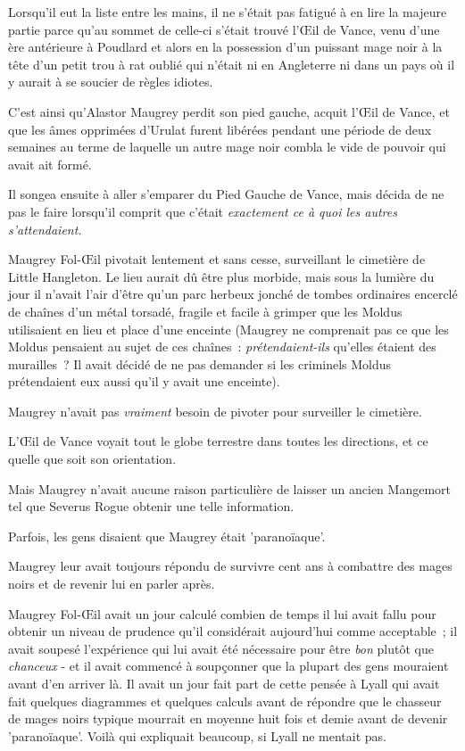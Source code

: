Lorsqu'il eut la liste entre les mains, il ne s'était pas fatigué à en lire la majeure partie parce qu'au sommet de celle-ci s'était trouvé l'Œil de Vance, venu d'une ère antérieure à Poudlard et alors en la possession d'un puissant mage noir à la tête d'un petit trou à rat oublié qui n'était ni en Angleterre ni dans un pays où il y aurait à se soucier de règles idiotes.

C'est ainsi qu'Alastor Maugrey perdit son pied gauche, acquit l'Œil de Vance, et que les âmes opprimées d'Urulat furent libérées pendant une période de deux semaines au terme de laquelle un autre mage noir combla le vide de pouvoir qui avait ait formé.

Il songea ensuite à aller s'emparer du Pied Gauche de Vance, mais décida de ne pas le faire lorsqu'il comprit que c'était \emph{exactement ce à quoi les autres s'attendaient.}

Maugrey Fol-Œil pivotait lentement et sans cesse, surveillant le cimetière de Little Hangleton. Le lieu aurait dû être plus morbide, mais sous la lumière du jour il n'avait l'air d'être qu'un parc herbeux jonché de tombes ordinaires encerclé de chaînes d'un métal torsadé, fragile et facile à grimper que les Moldus utilisaient en lieu et place d'une enceinte (Maugrey ne comprenait pas ce que les Moldus pensaient au sujet de ces chaînes~: \emph{prétendaient-ils} qu'elles étaient des murailles~? Il avait décidé de ne pas demander si les criminels Moldus prétendaient eux aussi qu'il y avait une enceinte).

Maugrey n'avait pas \emph{vraiment} besoin de pivoter pour surveiller le cimetière.

L'Œil de Vance voyait tout le globe terrestre dans toutes les directions, et ce quelle que soit son orientation.

Mais Maugrey n'avait aucune raison particulière de laisser un ancien Mangemort tel que Severus Rogue obtenir une telle information.

Parfois, les gens disaient que Maugrey était 'paranoïaque'.

Maugrey leur avait toujours répondu de survivre cent ans à combattre des mages noirs et de revenir lui en parler après.

Maugrey Fol-Œil avait un jour calculé combien de temps il lui avait fallu pour obtenir un niveau de prudence qu'il considérait aujourd'hui comme acceptable~; il avait soupesé l'expérience qui lui avait été nécessaire pour être \emph{bon} plutôt que \emph{chanceux} - et il avait commencé à soupçonner que la plupart des gens mouraient avant d'en arriver là. Il avait un jour fait part de cette pensée à Lyall qui avait fait quelques diagrammes et quelques calculs avant de répondre que le chasseur de mages noirs typique mourrait en moyenne huit fois et demie avant de devenir 'paranoïaque'. Voilà qui expliquait beaucoup, si Lyall ne mentait pas.

